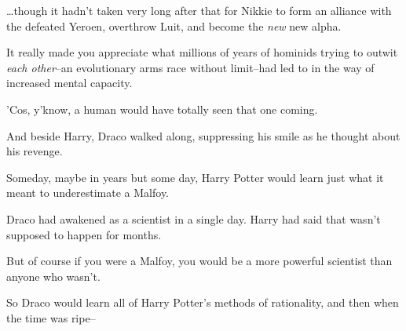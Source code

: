 {\ldots}though it hadn't taken very long after that for Nikkie to form an alliance with the defeated Yeroen, overthrow Luit, and become the \emph{new} new alpha.

It really made you appreciate what millions of years of hominids trying to outwit \emph{each other}\---an evolutionary arms race without limit\---had led to in the way of increased mental capacity.

'Cos, y'know, a human would have totally seen that one coming.

\later

And beside Harry, Draco walked along, suppressing his smile as he thought about his revenge.

Someday, maybe in years but some day, Harry Potter would learn just what it meant to underestimate a Malfoy.

Draco had awakened as a scientist in a single day. Harry had said that wasn't supposed to happen for months.

But of course if you were a Malfoy, you would be a more powerful scientist than anyone who wasn't.

So Draco would learn all of Harry Potter's methods of rationality, and then when the time was ripe\---

